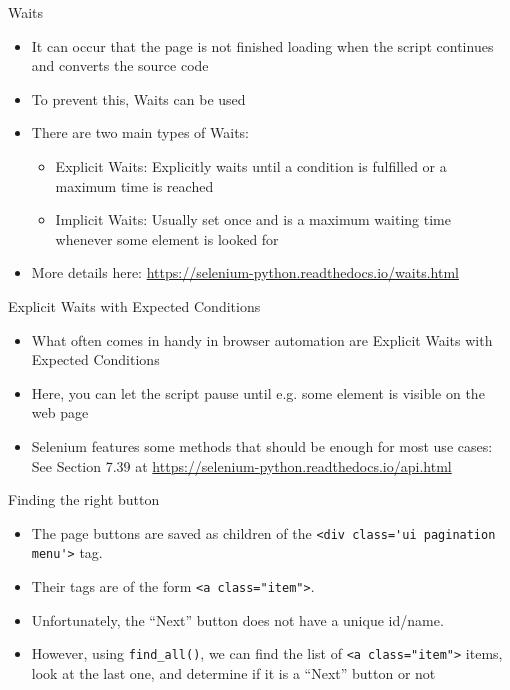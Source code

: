 \begin{frame}{Waits}
\begin{itemize}
	\item It can occur that the page is not finished loading when the script continues and converts the source code
	\item To prevent this, Waits can be used
	\item There are two main types of Waits:
	\begin{itemize}
		\item Explicit Waits: Explicitly waits until a condition is fulfilled or a maximum time is reached
		\item Implicit Waits: Usually set once and is a maximum waiting time whenever some element is looked for
	\end{itemize}
	\item More details here: \url{https://selenium-python.readthedocs.io/waits.html}
\end{itemize}
\end{frame}

\begin{frame}{Explicit Waits with Expected Conditions}
\begin{itemize}
	\item What often comes in handy in browser automation are Explicit Waits with Expected Conditions
	\item Here, you can let the script pause until e.g. some element is visible on the web page
	\item Selenium features some methods that should be enough for most use cases: See Section 7.39 at \url{https://selenium-python.readthedocs.io/api.html}
\end{itemize}
\end{frame}

\begin{frame}[fragile]{Finding the right button}
\begin{itemize}
	\item The page buttons are saved as children of the \verb!<div class='ui pagination menu'>! tag.
	\item Their tags are of the form \verb!<a class="item">!.
	\item Unfortunately, the ``Next'' button does not have a unique id/name.
	\item However, using \verb!find_all()!, we can find the list of \verb!<a class="item">! items, look at the last one, and determine if it is a ``Next'' button or not
\end{itemize}
\end{frame}